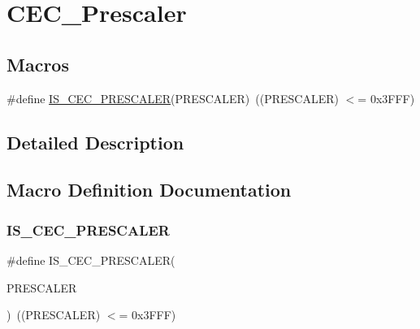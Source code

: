 \hypertarget{group___c_e_c___prescaler}{}\section{C\+E\+C\+\_\+\+Prescaler}
\label{group___c_e_c___prescaler}
\subsection*{Macros}
\begin{DoxyCompactItemize}
\item 
\#define \mbox{\hyperlink{group___c_e_c___prescaler_ga88ad62af56298609444942b8f05b6d23}{I\+S\+\_\+\+C\+E\+C\+\_\+\+P\+R\+E\+S\+C\+A\+L\+ER}}(P\+R\+E\+S\+C\+A\+L\+ER)~((P\+R\+E\+S\+C\+A\+L\+ER) $<$= 0x3\+F\+F\+F)
\end{DoxyCompactItemize}


\subsection{Detailed Description}


\subsection{Macro Definition Documentation}
\mbox{\label{group___c_e_c___prescaler_ga88ad62af56298609444942b8f05b6d23}} 
\subsubsection{\texorpdfstring{IS\_CEC\_PRESCALER}{IS\_CEC\_PRESCALER}}
{\footnotesize\ttfamily \#define I\+S\+\_\+\+C\+E\+C\+\_\+\+P\+R\+E\+S\+C\+A\+L\+ER(\begin{DoxyParamCaption}\item[{}]{P\+R\+E\+S\+C\+A\+L\+ER }\end{DoxyParamCaption})~((P\+R\+E\+S\+C\+A\+L\+ER) $<$= 0x3\+F\+F\+F)}

